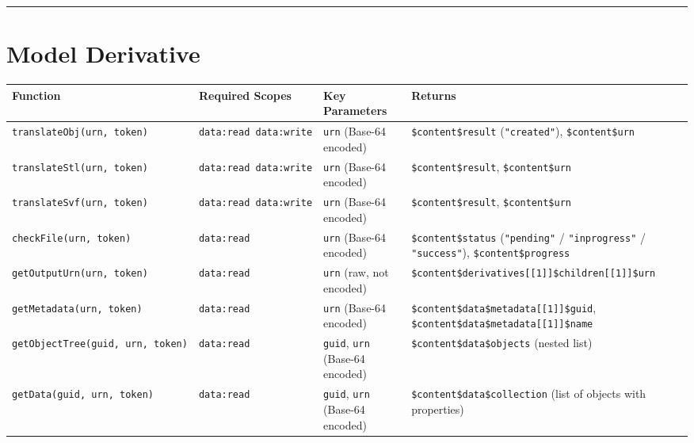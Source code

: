 \documentclass[
  11pt,
  letterpaper,
  DIV=11,
  numbers=noendperiod]{scrreprt}
\begin{document}
\begin{center}\rule{0.5\linewidth}{0.5pt}\end{center}

\section{Model Derivative}\label{model-derivative-1}

\begin{longtable}[]{@{}
  >{\raggedright\arraybackslash}p{}
  >{\raggedright\arraybackslash}p{}
  >{\raggedright\arraybackslash}p{}
  >{\raggedright\arraybackslash}p{}@{}}
\toprule\noalign{}
\begin{minipage}[b]{\linewidth}\raggedright
Function
\end{minipage} & \begin{minipage}[b]{\linewidth}\raggedright
Required Scopes
\end{minipage} & \begin{minipage}[b]{\linewidth}\raggedright
Key Parameters
\end{minipage} & \begin{minipage}[b]{\linewidth}\raggedright
Returns
\end{minipage} \\
\midrule\noalign{}
\endhead
\bottomrule\noalign{}
\endlastfoot
\texttt{translateObj(urn,\ token)} & \texttt{data:read\ data:write} &
\texttt{urn} (Base-64 encoded) & \texttt{\$content\$result}
(\texttt{"created"}), \texttt{\$content\$urn} \\
\texttt{translateStl(urn,\ token)} & \texttt{data:read\ data:write} &
\texttt{urn} (Base-64 encoded) & \texttt{\$content\$result},
\texttt{\$content\$urn} \\
\texttt{translateSvf(urn,\ token)} & \texttt{data:read\ data:write} &
\texttt{urn} (Base-64 encoded) & \texttt{\$content\$result},
\texttt{\$content\$urn} \\
\texttt{checkFile(urn,\ token)} & \texttt{data:read} & \texttt{urn}
(Base-64 encoded) & \texttt{\$content\$status} (\texttt{"pending"} /
\texttt{"inprogress"} / \texttt{"success"}),
\texttt{\$content\$progress} \\
\texttt{getOutputUrn(urn,\ token)} & \texttt{data:read} & \texttt{urn}
(raw, not encoded) &
\texttt{\$content\$derivatives{[}{[}1{]}{]}\$children{[}{[}1{]}{]}\$urn} \\
\texttt{getMetadata(urn,\ token)} & \texttt{data:read} & \texttt{urn}
(Base-64 encoded) &
\texttt{\$content\$data\$metadata{[}{[}1{]}{]}\$guid},
\texttt{\$content\$data\$metadata{[}{[}1{]}{]}\$name} \\
\texttt{getObjectTree(guid,\ urn,\ token)} & \texttt{data:read} &
\texttt{guid}, \texttt{urn} (Base-64 encoded) &
\texttt{\$content\$data\$objects} (nested list) \\
\texttt{getData(guid,\ urn,\ token)} & \texttt{data:read} &
\texttt{guid}, \texttt{urn} (Base-64 encoded) &
\texttt{\$content\$data\$collection} (list of objects with
properties) \\
\end{longtable}
\end{document}
